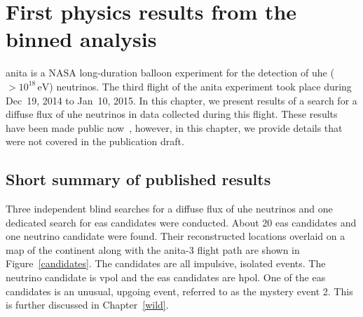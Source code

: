 \chapter{First physics results from the binned analysis}
\label{results_diffuse}

\gls{anita} is a NASA long-duration balloon experiment for the detection of \gls{uhe} ($>10^{18}\,\mbox{eV}$) neutrinos. 
The third flight of the \gls{anita} experiment took place during Dec~19, 2014 to Jan~10, 2015. In this chapter, we present results of a search for a diffuse flux of \gls{uhe} neutrinos in data collected during this flight. These results have been made public now~\cite{diffuse}, however, in this chapter, we provide details that were not covered in the publication draft. 

\section{Short summary of published results}

Three independent blind searches for a diffuse flux of \gls{uhe} neutrinos and one dedicated search for \gls{eas} candidates were conducted. About 20 \gls{eas} candidates and one neutrino candidate were found. Their reconstructed locations overlaid on a map of the continent along with the \gls{anita}-3 flight path are shown in Figure~\ref{candidates}. The candidates are all impulsive, isolated events. The neutrino candidate is \gls{vpol} and the \gls{eas} candidates are \gls{hpol}. One of the \gls{eas} candidates is an unusual, upgoing event, referred to as the mystery event 2. This is further discussed in Chapter~\ref{wild}. 


